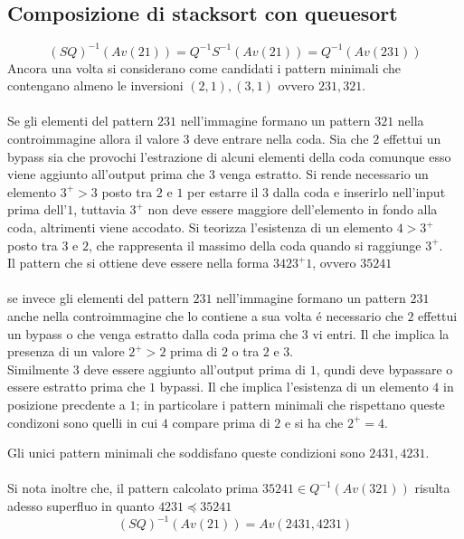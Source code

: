 \subsection*{Composizione di {stacksort} con {queuesort}}
$$(SQ)^{-1}(Av(21))=Q^{-1}S^{-1}(Av(21))=Q^{-1}(Av(231))$$Ancora una volta si considerano come candidati i pattern minimali che contengano almeno le inversioni $(2,1),(3,1)$ ovvero $231,321$.\\\\
Se gli elementi del pattern $231$ nell'immagine formano un pattern $321$ nella controimmagine allora il valore $3$ deve entrare nella coda. Sia che $2$ effettui un bypass sia che provochi l'estrazione di alcuni elementi della coda comunque esso viene aggiunto all'output prima che $3$ venga estratto. Si rende necessario un elemento $3^+>3$ posto tra $2$ e $1$ per estarre il $3$ dalla coda e inserirlo nell'input prima dell'$1$, tuttavia $3^+$ non deve essere maggiore dell'elemento in fondo alla coda, altrimenti viene accodato. Si teorizza l'esistenza di un elemento $4>3^+$ posto tra $3$ e $2$, che rappresenta il massimo della coda quando si raggiunge $3^+$.\\
Il pattern che si ottiene deve essere nella forma $3423^+1$, ovvero $35241$\\\\
se invece gli elementi del pattern $231$ nell'immagine formano un pattern $231$ anche nella controimmagine che lo contiene a sua volta \'e necessario che $2$ effettui un bypass o che venga estratto dalla coda prima che $3$ vi entri. Il che implica la presenza di un valore $2^+>2$ prima di $2$ o tra $2$ e $3$.\\Similmente $3$ deve essere aggiunto all'output prima di $1$, qundi deve bypassare o essere estratto prima che $1$ bypassi. Il che implica l'esistenza di un elemento $4$ in posizione precdente a $1$; in particolare i pattern minimali che rispettano queste condizoni sono quelli in cui $4$ compare prima di $2$ e si ha che $2^+=4$.\\
\begin{center}
\end{center}
Gli unici pattern minimali che soddisfano queste condizioni sono $2431,4231$.
\\\\Si nota inoltre che, il pattern calcolato prima $35241\in Q^{-1}(Av(321))$ risulta adesso superfluo in quanto $4231\preceq35241$
$$(SQ)^{-1}(Av(21))=Av(2431,4231)$$
